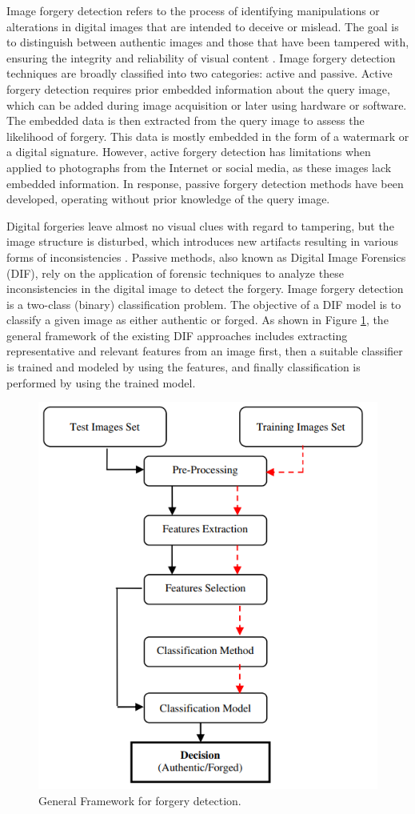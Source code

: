 Image forgery detection refers to the process of identifying manipulations or alterations in digital images that are intended to deceive or mislead. The goal is to distinguish between authentic images and those that have been tampered with, ensuring the integrity and reliability of visual content \cite{MeenaTyagi2021}. Image forgery detection techniques are broadly classified into two categories: active and passive. Active forgery detection requires prior embedded information about the query image, which can be added during image acquisition or later using hardware or software. The embedded data is then extracted from the query image to assess the likelihood of forgery. This data is mostly embedded in the form of a watermark or a digital signature.\cite{zanardelli2023image} However, active forgery detection has limitations when applied to photographs from the Internet or social media, as these images lack embedded information. In response, passive forgery detection methods have been developed, operating without prior knowledge of the query image.\cite{MeenaTyagi2021}

Digital forgeries leave almost no visual clues with regard to tampering, but the image structure is disturbed, which introduces new artifacts resulting in various forms of inconsistencies \cite{Lian2010}. Passive methods, also known as Digital Image Forensics (DIF), rely on the application of forensic techniques to analyze these inconsistencies in the digital image to detect the forgery\cite{FERREIRA2020106685}. Image forgery detection is a two-class (binary) classification problem. The objective of a DIF model is to classify a given image as either authentic or forged. As shown in Figure \ref{fig:framework}, the general framework of the existing DIF approaches includes extracting representative and relevant features from an image first, then a suitable classifier is trained and modeled by using the features, and finally classification is performed by using the trained model. 

\begin{figure}[h!]
  \centering
  \includegraphics[width=0.5\linewidth]{figures/DetectionWorkflow.png} %
  \caption{General Framework for forgery detection.}
  \label{fig:framework}
\end{figure}

